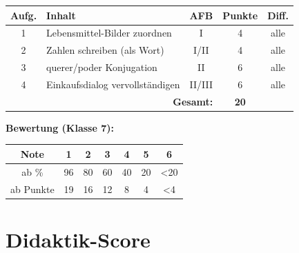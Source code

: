 \documentclass[11pt,a4paper]{article}
\begin{document}
\begin{tabular}{|c|l|c|c|c|}
\hline
\textbf{Aufg.} & \textbf{Inhalt} & \textbf{AFB} & \textbf{Punkte} & \textbf{Diff.} \\
\hline
1 & Lebensmittel-Bilder zuordnen & I & 4 & alle \\
\hline
2 & Zahlen schreiben (als Wort) & I/II & 4 & alle \\
\hline
3 & querer/poder Konjugation & II & 6 & alle \\
\hline
4 & Einkaufsdialog vervollständigen & II/III & 6 & alle \\
\hline
\multicolumn{3}{|r|}{\textbf{Gesamt:}} & \textbf{20} & \\
\hline
\end{tabular}

\textbf{Bewertung (Klasse 7):}
\begin{tabular}{|c|c|c|c|c|c|c|}
\hline
Note & 1 & 2 & 3 & 4 & 5 & 6 \\
\hline
ab \% & 96 & 80 & 60 & 40 & 20 & <20 \\
\hline
ab Punkte & 19 & 16 & 12 & 8 & 4 & <4 \\
\hline
\end{tabular}

\newpage
\section{Didaktik-Score}
\end{document}
